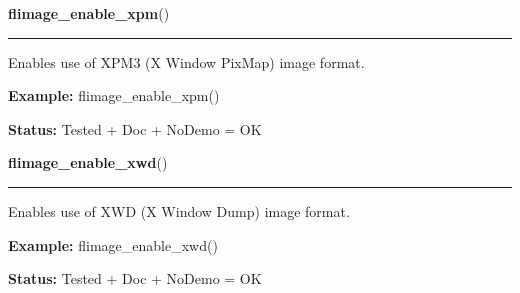 \hspace{.8\funcindent}\begin{boxedminipage}{\funcwidth}

    \raggedright \textbf{flimage\_enable\_xpm}()

    \vspace{-1.5ex}

    \rule{\textwidth}{0.5\fboxrule}
\setlength{\parskip}{2ex}
    Enables use of XPM3 (X Window PixMap) image format.

\setlength{\parskip}{1ex}
\textbf{Example:} flimage\_enable\_xpm()



\textbf{Status:} Tested + Doc + NoDemo = OK



    \end{boxedminipage}

    \label{xformslib:flflimage:flimage_enable_xwd}

    \vspace{0.5ex}

\hspace{.8\funcindent}\begin{boxedminipage}{\funcwidth}

    \raggedright \textbf{flimage\_enable\_xwd}()

    \vspace{-1.5ex}

    \rule{\textwidth}{0.5\fboxrule}
\setlength{\parskip}{2ex}
    Enables use of XWD (X Window Dump) image format.

\setlength{\parskip}{1ex}
\textbf{Example:} flimage\_enable\_xwd()



\textbf{Status:} Tested + Doc + NoDemo = OK



    \end{boxedminipage}

    \label{xformslib:flflimage:flimage_free_ci}

    \vspace{0.5ex}

